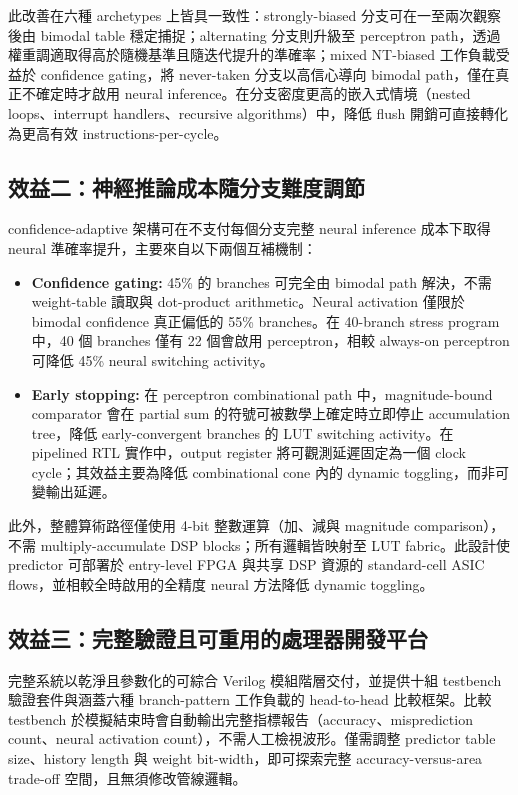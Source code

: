 \documentclass[12pt,a4paper]{article}
\begin{document}
	此改善在六種 archetypes 上皆具一致性：strongly-biased 分支可在一至兩次觀察後由 bimodal table 穩定捕捉；alternating 分支則升級至 perceptron path，透過權重調適取得高於隨機基準且隨迭代提升的準確率；mixed NT-biased 工作負載受益於 confidence gating，將 never-taken 分支以高信心導向 bimodal path，僅在真正不確定時才啟用 neural inference。在分支密度更高的嵌入式情境（nested loops、interrupt handlers、recursive algorithms）中，降低 flush 開銷可直接轉化為更高有效 instructions-per-cycle。

	\subsection*{效益二：神經推論成本隨分支難度調節}

	confidence-adaptive 架構可在不支付每個分支完整 neural inference 成本下取得 neural 準確率提升，主要來自以下兩個互補機制：

	\begin{itemize}
		\item \textbf{Confidence gating:} 45\% 的 branches 可完全由 bimodal path 解決，不需 weight-table 讀取與 dot-product arithmetic。Neural activation 僅限於 bimodal confidence 真正偏低的 55\% branches。在 40-branch stress program 中，40 個 branches 僅有 22 個會啟用 perceptron，相較 always-on perceptron 可降低 45\% neural switching activity。

		\item \textbf{Early stopping:} 在 perceptron combinational path 中，magnitude-bound comparator 會在 partial sum 的符號可被數學上確定時立即停止 accumulation tree，降低 early-convergent branches 的 LUT switching activity。在 pipelined RTL 實作中，output register 將可觀測延遲固定為一個 clock cycle；其效益主要為降低 combinational cone 內的 dynamic toggling，而非可變輸出延遲。
	\end{itemize}

	此外，整體算術路徑僅使用 4-bit 整數運算（加、減與 magnitude comparison），不需 multiply-accumulate DSP blocks；所有邏輯皆映射至 LUT fabric。此設計使 predictor 可部署於 entry-level FPGA 與共享 DSP 資源的 standard-cell ASIC flows，並相較全時啟用的全精度 neural 方法降低 dynamic toggling。

	\subsection*{效益三：完整驗證且可重用的處理器開發平台}

	完整系統以乾淨且參數化的可綜合 Verilog 模組階層交付，並提供十組 testbench 驗證套件與涵蓋六種 branch-pattern 工作負載的 head-to-head 比較框架。比較 testbench 於模擬結束時會自動輸出完整指標報告（accuracy、misprediction count、neural activation count），不需人工檢視波形。僅需調整 predictor table size、history length 與 weight bit-width，即可探索完整 accuracy-versus-area trade-off 空間，且無須修改管線邏輯。
\end{document}
